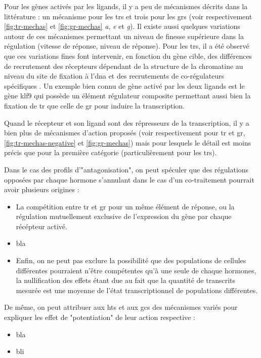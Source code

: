 \documentclass[../main.tex]{subfiles}
\begin{document}
Pour les gènes activés par les ligands, il y a peu de mécanismes décrits dans la littérature :
un mécanisme pour les \glspl{tr} et trois pour les \glspl{gr} (voir respectivement \autoref{fig:tr-mechas} et \autoref{fig:gr-mechas} \textit{a}, \textit{e} et \textit{g}).
Il existe aussi quelques variations autour de ces mécanismes permettant un niveau de finesse supérieure dans la régulation (vitesse de réponse, niveau de réponse).
Pour les \glspl{tr}, il a été observé que ces variations fines font intervenir, en fonction du gène cible, des différences de recrutement des récepteurs dépendant de la structure de la chromatine au niveau du site de fixation à l'\gls{dna} \citep{Bilesimo2011} et des recrutements de co-régulateurs spécifiques \citep{Havis2003}.
Un exemple bien connu de gène activé par les deux ligands est le gène \gls{klf9} qui possède un élément régulateur composite permettant aussi bien la fixation de \gls{tr} que celle de \gls{gr} pour induire la transcription.
\par
Quand le récepteur et son ligand sont des répresseurs de la transcription, il y a bien plus de mécanismes d'action proposés (voir respectivement pour \gls{tr} et \gls{gr}, \autoref{fig:tr-mechas-negative} et \autoref{fig:gr-mechas}) mais pour lesquels le détail est moins précis que pour la première catégorie (particulièrement pour les \glspl{tr}).
\par
Dans le cas des profils d'"antagonisation", on peut spéculer que des régulations opposées par chaque hormone s'annulant dans le cas d'un co-traitement pourrait avoir plusieurs origines :
\begin{itemize}
\item La compétition entre \gls{tr} et \gls{gr} pour un même élément de réponse, ou la régulation mutuellement exclusive de l'expression du gène par chaque récépteur activé.
\item bla
\item Enfin, on ne peut pas exclure la possibilité que des populations de cellules différentes pourraient n'être compétentes qu'à une seule de chaque hormones, la nullification des effets étant due au fait que la quantité de transcrits mesurée est une moyenne de l'état transcriptionnel de populations différentes.
\end{itemize}
De même, on peut attribuer aux \glspl{ht} et aux \glspl{gc} des mécanismes variés pour expliquer les effet de "potentiation" de leur action respective :
\begin{itemize}
\item bla
\item bli
\end{itemize}
\end{document}
